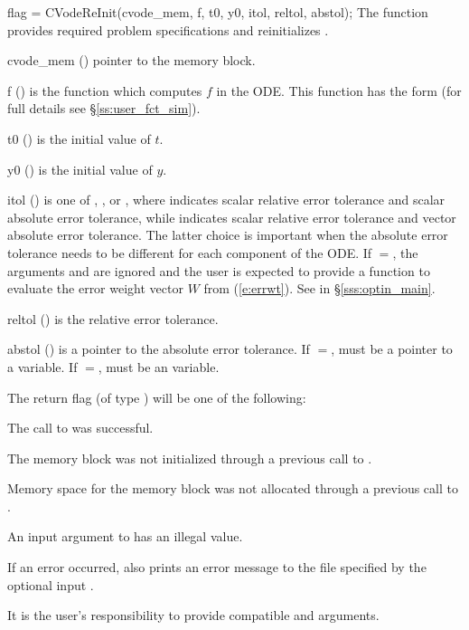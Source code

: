 {
  flag = CVodeReInit(cvode\_mem, f, t0, y0, itol, reltol, abstol);
}
{
  The function  provides required problem specifications 
  and reinitializes {\cvodes}.
}
{
  \begin{args}
  \item[cvode\_mem] ()
    pointer to the {\cvodes} memory block.
  \item[f] ()
    is the {\C} function which computes $f$ in the ODE. This function has the form 
     (for full details see \S\ref{ss:user_fct_sim}).
  \item[t0] ()
    is the initial value of $t$.
  \item[y0] ()
    is the initial value of $y$. 
  \item[itol] () 
    is one of , , or , where  indicates scalar
    relative error tolerance and scalar absolute error tolerance, while
     indicates scalar relative error tolerance and vector
    absolute error tolerance.  The latter choice is important when the absolute
    error tolerance needs to be different for each component of the ODE. 
    If $=$, the arguments  and  are ignored
    and the user is expected to provide a function to evaluate the error weight vector
    $W$ from (\ref{e:errwt}). See  in \S\ref{sss:optin_main}.
  \item[reltol] ()
    is the relative error tolerance.
  \item[abstol] ()
    is a pointer to the absolute error tolerance.  If $=$, 
    must be a pointer to a  variable. If $=$, 
    must be an  variable.
  \end{args}
}
{
  The return flag  (of type ) will be one of the following:
  \begin{args}[CV\_NO\_MALLOC]
  \item[\Id{CV\_SUCCESS}]
    The call to  was successful.
  \item[\Id{CV\_MEM\_NULL}] 
    The {\cvodes} memory block was not initialized through a 
    previous call to .
  \item[\Id{CV\_NO\_MALLOC}] 
    Memory space for the {\cvodes} memory block was not allocated through a 
    previous call to .
  \item[\Id{CV\_ILL\_INPUT}] 
    An input argument to  has an illegal value.
  \end{args}
}
{
  If an error occurred,  also prints an error message to the
  file specified by the optional input .

  {\warn}It is the user's responsibility to provide compatible  and
   arguments.
}

